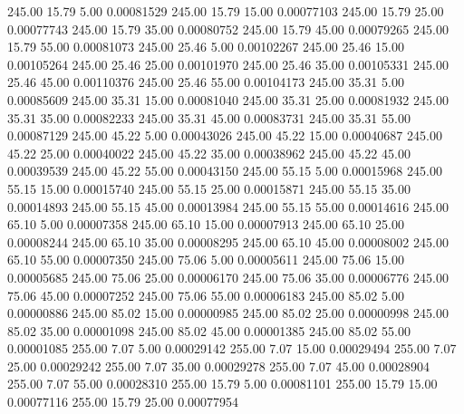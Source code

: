     245.00     15.79      5.00     0.00081529
    245.00     15.79     15.00     0.00077103
    245.00     15.79     25.00     0.00077743
    245.00     15.79     35.00     0.00080752
    245.00     15.79     45.00     0.00079265
    245.00     15.79     55.00     0.00081073
    245.00     25.46      5.00     0.00102267
    245.00     25.46     15.00     0.00105264
    245.00     25.46     25.00     0.00101970
    245.00     25.46     35.00     0.00105331
    245.00     25.46     45.00     0.00110376
    245.00     25.46     55.00     0.00104173
    245.00     35.31      5.00     0.00085609
    245.00     35.31     15.00     0.00081040
    245.00     35.31     25.00     0.00081932
    245.00     35.31     35.00     0.00082233
    245.00     35.31     45.00     0.00083731
    245.00     35.31     55.00     0.00087129
    245.00     45.22      5.00     0.00043026
    245.00     45.22     15.00     0.00040687
    245.00     45.22     25.00     0.00040022
    245.00     45.22     35.00     0.00038962
    245.00     45.22     45.00     0.00039539
    245.00     45.22     55.00     0.00043150
    245.00     55.15      5.00     0.00015968
    245.00     55.15     15.00     0.00015740
    245.00     55.15     25.00     0.00015871
    245.00     55.15     35.00     0.00014893
    245.00     55.15     45.00     0.00013984
    245.00     55.15     55.00     0.00014616
    245.00     65.10      5.00     0.00007358
    245.00     65.10     15.00     0.00007913
    245.00     65.10     25.00     0.00008244
    245.00     65.10     35.00     0.00008295
    245.00     65.10     45.00     0.00008002
    245.00     65.10     55.00     0.00007350
    245.00     75.06      5.00     0.00005611
    245.00     75.06     15.00     0.00005685
    245.00     75.06     25.00     0.00006170
    245.00     75.06     35.00     0.00006776
    245.00     75.06     45.00     0.00007252
    245.00     75.06     55.00     0.00006183
    245.00     85.02      5.00     0.00000886
    245.00     85.02     15.00     0.00000985
    245.00     85.02     25.00     0.00000998
    245.00     85.02     35.00     0.00001098
    245.00     85.02     45.00     0.00001385
    245.00     85.02     55.00     0.00001085
    255.00      7.07      5.00     0.00029142
    255.00      7.07     15.00     0.00029494
    255.00      7.07     25.00     0.00029242
    255.00      7.07     35.00     0.00029278
    255.00      7.07     45.00     0.00028904
    255.00      7.07     55.00     0.00028310
    255.00     15.79      5.00     0.00081101
    255.00     15.79     15.00     0.00077116
    255.00     15.79     25.00     0.00077954

